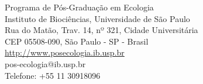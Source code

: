 \documentclass[twoside a4paper 12pt]{report}
\begin{document}
\vspace*{\fill} 
\begin{flushright}
  \begin{spacing}{1.1}
    {\large Programa de Pós-Graduação em Ecologia\\
      Instituto de Biociências, Universidade de São Paulo\\
      Rua do Matão, Trav. 14, nº 321, Cidade Universitária\\
      CEP 05508-090, São Paulo - SP - Brasil\\[1.5em]
      \url{http://www.posecologia.ib.usp.br}\\
      pos-ecologia@ib.usp.br \\ 
      Telefone: +55 11 30918096\\
    }
  \end{spacing}  
\end{flushright}
\end{document}

